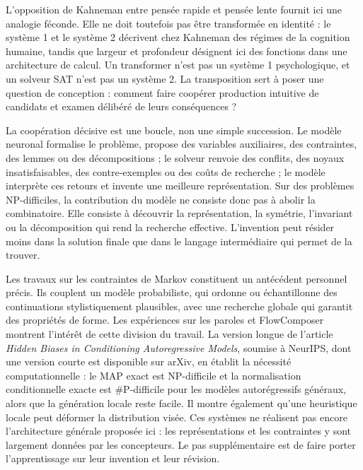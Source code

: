 \documentclass[10pt,a4paper]{article}
\begin{document}
L'opposition de Kahneman entre pensée rapide et pensée lente fournit ici une analogie féconde. Elle ne doit toutefois pas être transformée en identité : le système 1 et le système 2 décrivent chez Kahneman des régimes de la cognition humaine, tandis que largeur et profondeur désignent ici des fonctions dans une architecture de calcul. Un transformer n'est pas un système 1 psychologique, et un solveur SAT n'est pas un système 2. La transposition sert à poser une question de conception : comment faire coopérer production intuitive de candidats et examen délibéré de leurs conséquences ?

La coopération décisive est une boucle, non une simple succession. Le modèle neuronal formalise le problème, propose des variables auxiliaires, des contraintes, des lemmes ou des décompositions ; le solveur renvoie des conflits, des noyaux insatisfaisables, des contre-exemples ou des coûts de recherche ; le modèle interprète ces retours et invente une meilleure représentation. Sur des problèmes NP-difficiles, la contribution du modèle ne consiste donc pas à abolir la combinatoire. Elle consiste à découvrir la représentation, la symétrie, l'invariant ou la décomposition qui rend la recherche effective. L'invention peut résider moins dans la solution finale que dans le langage intermédiaire qui permet de la trouver.

Les travaux sur les contraintes de Markov constituent un antécédent personnel précis. Ils couplent un modèle probabiliste, qui ordonne ou échantillonne des continuations stylistiquement plausibles, avec une recherche globale qui garantit des propriétés de forme. Les expériences sur les paroles et FlowComposer montrent l'intérêt de cette division du travail. La version longue de l'article \emph{Hidden Biases in Conditioning Autoregressive Models}, soumise à NeurIPS, dont une version courte est disponible sur arXiv, en établit la nécessité computationnelle : le MAP exact est NP-difficile et la normalisation conditionnelle exacte est \#P-difficile pour les modèles autorégressifs généraux, alors que la génération locale reste facile. Il montre également qu'une heuristique locale peut déformer la distribution visée. Ces systèmes ne réalisent pas encore l'architecture générale proposée ici : les représentations et les contraintes y sont largement données par les concepteurs. Le pas supplémentaire est de faire porter l'apprentissage sur leur invention et leur révision.
\end{document}
